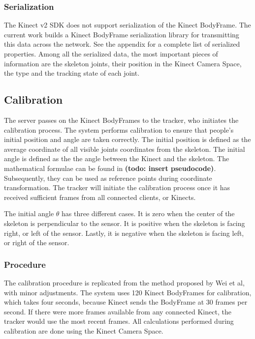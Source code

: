 \documentclass{sigchi}
\begin{document}
\subsubsection{Serialization}

The Kinect v2 SDK does not support serialization of the Kinect BodyFrame. The current work builds a Kinect BodyFrame serialization library for transmitting this data across the network. See the appendix for a complete list of serialized properties. Among all the serialized data, the most important pieces of information are the skeleton joints, their position in the Kinect Camera Space, the type and the tracking state of each joint.

\subsection{Calibration}

The server passes on the Kinect BodyFrames to the tracker, who initiates the calibration process. The system performs calibration to ensure that people's initial position and angle are taken correctly. The initial position is defined as the average coordinate of all visible joints coordinates from the skeleton. The initial angle is defined as the the angle between the Kinect and the skeleton. The mathematical formulae can be found in \textbf{(todo: insert pseudocode)}. Subsequently, they can be used as reference points during coordinate transformation. The tracker will initiate the calibration process once it has received sufficient frames from all connected clients, or Kinects.

The initial angle $\theta$ has three different cases. It is zero when the center of the skeleton is perpendicular to the sensor. It is positive when the skeleton is facing right, or left of the sensor. Lastly, it is negative when the skeleton is facing left, or right of the sensor.

\subsubsection{Procedure}

The calibration procedure is replicated from the method proposed by Wei et al, with minor adjustments. The system uses 120 Kinect BodyFrames for calibration, which takes four seconds, because Kinect sends the BodyFrame at 30 frames per second. If there were more frames available from any connected Kinect, the tracker would use the most recent frames. All calculations performed during calibration are done using the Kinect Camera Space.
\end{document}

